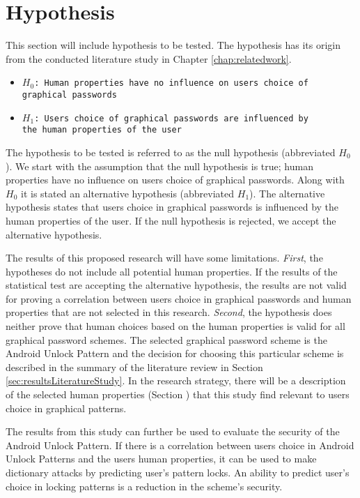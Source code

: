 \section{Hypothesis}\label{sec:hypothesis}

	This section will include hypothesis to be tested. The hypothesis has its origin from the conducted literature study in Chapter \ref{chap:relatedwork}.

	{\renewcommand\labelitemi{}
		\begin{itemize}
  		\item \texttt{$H_{0}$: Human properties have no influence on users choice of \\graphical passwords}
  		\item \texttt{$H_{1}$: Users choice of graphical passwords are influenced by \\the human properties of the user}
  	\end{itemize}
  }

  The hypothesis to be tested is referred to as the null hypothesis (abbreviated $H_{0}$). We start with the assumption that the null hypothesis is true; human properties have no influence on users choice of graphical passwords. Along with $H_{0}$ it is stated an alternative hypothesis (abbreviated $H_{1}$). The alternative hypothesis states that users choice in graphical passwords is influenced by the human properties of the user. If the null hypothesis is rejected, we accept the alternative hypothesis.

  The results of this proposed research will have some limitations. {\it First}, the hypotheses do not include all potential human properties. If the results of the statistical test are accepting the alternative hypothesis, the results are not valid for proving a correlation between users choice in graphical passwords and human properties that are not selected in this research. {\it Second}, the hypothesis does neither prove that human choices based on the human properties is valid for all graphical password schemes. The selected graphical password scheme is the Android Unlock Pattern and the decision for choosing this particular scheme is described in the summary of the literature review in Section \ref{sec:resultsLiteratureStudy}. In the research strategy, there will be a description of the selected human properties (Section ) that this study find relevant to users choice in graphical patterns.

  The results from this study can further be used to evaluate the security of the Android Unlock Pattern. If there is a correlation between users choice in Android Unlock Patterns and the users human properties, it can be used to make dictionary attacks by predicting user's pattern locks. An ability to predict user's choice in locking patterns is a reduction in the scheme's security. 

